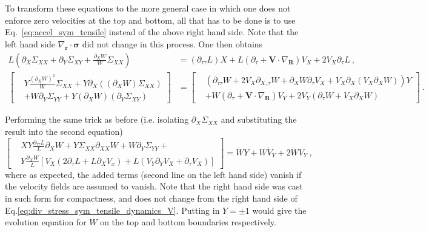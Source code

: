 \documentclass[12pt,a4paper]{article}
\begin{document}
To transform these equations to the more general case in which one does not enforce zero velocities at the top and bottom, all that has to be done is to use Eq.~\eqref{eq:accel_sym_tensile} instead of the above right hand side. Note that the left hand side $\nabla_{\bm{r}}\cdot\bm{\sigma}$ did not change in this process. One then obtains
\begin{equation}\label{eq:div_stress_sym_tensile_dynamics_V}
  \begin{split}
     L\left(\partial_X\Sigma_{XX} + \partial_Y\Sigma_{XY} + \frac{\partial_X W}{W} \Sigma_{XX}\right) & = \left(\partial_{\tau\tau}L\right) X + L\left(\partial_\tau + \bm{V}\cdot\nabla_{\bm{R}}\right)V_X + 2 V_X \partial_\tau L  \ , \\
      \left[\begin{split}&Y\frac{\left(\partial_X W\right)^2}{W}\Sigma_{XX} + Y \partial_X \left(\left(\partial_X W\right) \Sigma_{XX}\right) \\ & +  W\partial_Y\Sigma_{YY} + Y\left(\partial_X W\right)\left( \partial_Y \Sigma_{XY}\right) \end{split}\right] & = \left[\begin{split}
                                                       &  \left(\partial_{\tau\tau}W + 2 V_X\partial_{X,\tau}W + \partial_X W \partial_\tau V_X + V_X\partial_X\left(V_X\partial_X W\right)\right)Y \\
                                                        & + W\left(\partial_\tau + \bm{V}\cdot\nabla_{\bm{R}}\right)V_Y + 2 V_Y \left(\partial_\tau W + V_X \partial_X W\right)
                                                   \end{split}\right] \ .
  \end{split}
\end{equation}

Performing the same trick as before (i.e. isolating $\partial_X \Sigma_{XX}$ and substituting the result into the second equation)
\begin{equation}\label{eq:div_stress_sym_tensile_combined_V}
\left[\begin{split}
         &X Y\frac{\partial_{\tau \tau} L}{L}\partial_X W + Y\Sigma_{XX}\partial_{XX}W + W\partial_Y \Sigma_{YY}  + \\
          &Y \frac{\partial_X W}{L}\left[V_X\left(2\partial_{\tau}L + L \partial_X V_x\right) + L\left(V_Y \partial_Y V_X + \partial_\tau V_X\right)\right]
      \end{split}\right] = \ddot{W} Y + W \dot{V}_Y + 2 \dot{W} V_Y\ ,
\end{equation}
where as expected, the added terms (second line on the left hand side) vanish if the velocity fields are assumed to vanish. Note that the right hand side was cast in such form for compactness, and does not change from the right hand side of Eq.\eqref{eq:div_stress_sym_tensile_dynamics_V}. Putting in $Y=\pm 1$ would give the evolution equation for $W$ on the top and bottom boundaries respectively.
\end{document}
